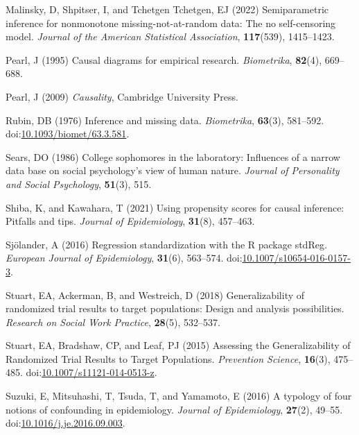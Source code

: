 \documentclass[
  single column]{article}
\newlength{\cslhangindent}
\newenvironment{CSLReferences}[2] %
 {\begin{list}{}{%
  \setlength{\itemindent}{0pt}
  \setlength{\leftmargin}{0pt}
  \setlength{\parsep}{0pt}
  \ifodd #1
   \setlength{\leftmargin}{\cslhangindent}
   \setlength{\itemindent}{-1\cslhangindent}
  \fi
  \setlength{\itemsep}{#2\baselineskip}}}
 {\end{list}}
\begin{document}
\begin{CSLReferences}{1}{0}
Malinsky, D, Shpitser, I, and Tchetgen Tchetgen, EJ (2022)
Semiparametric inference for nonmonotone missing-not-at-random data: The
no self-censoring model. \emph{Journal of the American Statistical
Association}, \textbf{117}(539), 1415--1423.

Pearl, J (1995) Causal diagrams for empirical research.
\emph{Biometrika}, \textbf{82}(4), 669--688.

Pearl, J (2009) \emph{Causality}, Cambridge University Press.

Rubin, DB (1976) Inference and missing data. \emph{Biometrika},
\textbf{63}(3), 581--592.
doi:\href{https://doi.org/10.1093/biomet/63.3.581}{10.1093/biomet/63.3.581}.

Sears, DO (1986) College sophomores in the laboratory: Influences of a
narrow data base on social psychology's view of human nature.
\emph{Journal of Personality and Social Psychology}, \textbf{51}(3),
515.

Shiba, K, and Kawahara, T (2021) Using propensity scores for causal
inference: Pitfalls and tips. \emph{Journal of Epidemiology},
\textbf{31}(8), 457--463.

Sjölander, A (2016) Regression standardization with the R package
stdReg. \emph{European Journal of Epidemiology}, \textbf{31}(6),
563--574.
doi:\href{https://doi.org/10.1007/s10654-016-0157-3}{10.1007/s10654-016-0157-3}.

Stuart, EA, Ackerman, B, and Westreich, D (2018) Generalizability of
randomized trial results to target populations: Design and analysis
possibilities. \emph{Research on Social Work Practice}, \textbf{28}(5),
532--537.

Stuart, EA, Bradshaw, CP, and Leaf, PJ (2015) Assessing the
Generalizability of Randomized Trial Results to Target Populations.
\emph{Prevention Science}, \textbf{16}(3), 475--485.
doi:\href{https://doi.org/10.1007/s11121-014-0513-z}{10.1007/s11121-014-0513-z}.

Suzuki, E, Mitsuhashi, T, Tsuda, T, and Yamamoto, E (2016) A typology of
four notions of confounding in epidemiology. \emph{Journal of
Epidemiology}, \textbf{27}(2), 49--55.
doi:\href{https://doi.org/10.1016/j.je.2016.09.003}{10.1016/j.je.2016.09.003}.


\end{CSLReferences}
\end{document}
